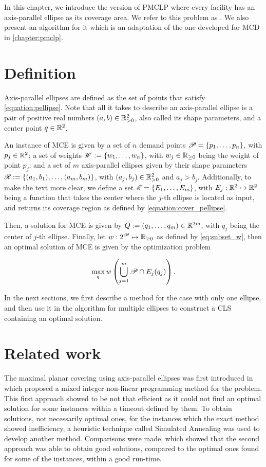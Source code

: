 In this chapter, we introduce the version of PMCLP where every 
facility has an axis-parallel ellipse as its coverage area. We refer to this problem as . We also present an algorithm for it which is an adaptation of the one developed for MCD in \autoref{chapter:pmclp}.

\section{Definition}

Axis-parallel ellipses are defined as the set of points that satisfy \autoref{equation:pellipse}. Note that all it takes to describe an axis-parallel ellipse is a pair of positive real numbers $(a,b) \in \mathbb{R}_{>0}^2$, also called its shape parameters, and a center point $q \in \mathbb{R}^2$.

An instance of MCE is given by a set of $n$ demand points $\mathscr{P} = \{p_1, \dots, p_n\}$, with $p_j\in\mathbb{R}^2$; 
a set of weights $\mathscr{W}:=\{w_1, \dots, w_n\}$, with $w_j\in\mathbb{R}_{\ge0}$ being the weight of point $p_j$;
and a set of $m$ axis-parallel ellipses given by their shape parameters $\mathscr{R}:=\{(a_1, b_1), \dots, (a_m, b_m)\}$, with $(a_j, b_j)\in\mathbb{R}_{>0}^2$ and $a_j>b_j$.
Additionally, to make the text more clear, we define a set $\mathscr{E} = \{E_1, \dots, E_m\}$, with $E_j : \mathbb{R}^2 \mapsto \mathbb{R}^2$ being a function that takes the center where the $j$-th ellipse is located as input, and returns its coverage region as defined by \autoref{equation:cover_pellipse}.

Then, a solution for MCE is given by $Q:=(q_1, \dots, q_m)\in\mathbb{R}^{2m}$, with $q_j$ being the center of $j$-th ellipse. Finally, let $w : 2^{\mathscr{P}} \mapsto \mathbb{R}_{\ge0}$ as defined by \autoref{eq:subset_w}, then an optimal solution of MCE is given by the optimization problem

\begin{equation*}
\max_q w\left(\bigcup_{j=1}^m \mathscr{P} \cap E_j(q_j)\right).
\end{equation*}

In the next sections, we first describe a method for the case with only one ellipse, and then use it in the algorithm for multiple ellipses to construct a CLS containing an optimal solution.

\section{Related work}
The maximal planar covering using axis-parallel ellipses was first introduced in  which proposed a mixed integer non-linear programming method for the problem. This first approach showed to be not that efficient as it could not find an optimal solution for some instances within a timeout defined by them. To obtain solutions, not necessarily optimal ones, for the instances which the exact method showed inefficiency, a heuristic technique called Simulated Annealing was used to develop another method. Comparisons were made, which showed that the second approach was able to obtain good solutions, compared to the optimal ones found for some of the instances, within a good run-time.

